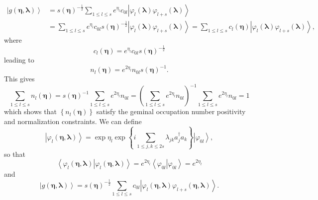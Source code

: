 \documentclass[aps,preprint]{revtex4}%
\begin{document}
\begin{align}
\left\vert g\left(  \mathbf{\eta},\mathbf{\lambda}\right)  \right\rangle  &
=\mathit{s}\left(  \mathbf{\eta}\right)  ^{-\frac{1}{2}}\sum_{1\leq l\leq
s}e^{\eta_{l}}c_{0l}\left\vert \varphi_{l}\left(  \mathbf{\lambda}\right)
\varphi_{l+s}\left(  \mathbf{\lambda}\right)  \right\rangle \\
&  =\sum_{1\leq l\leq s}e^{\eta_{l}}c_{0l}\mathit{s}\left(  \mathbf{\eta
}\right)  ^{-\frac{1}{2}}\left\vert \varphi_{l}\left(  \mathbf{\lambda
}\right)  \varphi_{l+s}\left(  \mathbf{\lambda}\right)  \right\rangle
=\sum_{1\leq l\leq s}c_{l}\left(  \mathbf{\eta}\right)  \left\vert \varphi
_{l}\left(  \mathbf{\lambda}\right)  \varphi_{l+s}\left(  \mathbf{\lambda
}\right)  \right\rangle ,
\end{align}
where
\begin{equation}
c_{l}\left(  \mathbf{\eta}\right)  =e^{\eta_{l}}c_{0l}\mathit{s}\left(
\mathbf{\eta}\right)  ^{-\frac{1}{2}}%
\end{equation}
leading to
\begin{equation}
n_{l}\left(  \mathbf{\eta}\right)  =e^{2\eta_{l}}n_{0l}\mathit{s}\left(
\mathbf{\eta}\right)  ^{-1}.
\end{equation}
This gives
\begin{equation}
\sum_{1\leq l\leq s}n_{l}\left(  \mathbf{\eta}\right)  =\mathit{s}\left(
\mathbf{\eta}\right)  ^{-1}\sum_{1\leq l\leq s}e^{2\eta_{l}}n_{0l}=\left(
\sum_{1\leq l\leq s}e^{2\eta_{l}}n_{0l}\right)  ^{-1}\sum_{1\leq l\leq
s}e^{2\eta_{l}}n_{0l}=1
\end{equation}
which shows that $\left\{  n_{l}\left(  \mathbf{\eta}\right)  \right\}  $
satisfy the geminal occupation number positivity and normalization
constraints. We can define%
\begin{equation}
\left\vert \varphi_{l}\left(  \mathbf{\eta,\lambda}\right)  \right\rangle
=\exp\eta_{l}\exp\left\{  i\sum_{1\leq j,k\leq2s}\lambda_{jk}a_{j}^{\dagger
}a_{k}\right\}  \left\vert \varphi_{0l}\right\rangle ,
\end{equation}
so that
\begin{equation}
\left\langle \left.  \varphi_{l}\left(  \mathbf{\eta,\lambda}\right)
\right\vert \varphi_{l}\left(  \mathbf{\eta,\lambda}\right)  \right\rangle
=e^{2\eta_{l}}\left\langle \left.  \varphi_{0l}\right\vert \varphi
_{0l}\right\rangle =e^{2\eta_{l}}%
\end{equation}
and
\begin{equation}
\left\vert g\left(  \mathbf{\eta},\mathbf{\lambda}\right)  \right\rangle
=\mathit{s}\left(  \mathbf{\eta}\right)  ^{-\frac{1}{2}}\sum_{1\leq l\leq
s}c_{0l}\left\vert \varphi_{l}\left(  \mathbf{\eta,\lambda}\right)
\varphi_{l+s}\left(  \mathbf{\eta,\lambda}\right)  \right\rangle .
\end{equation}
\end{document}

